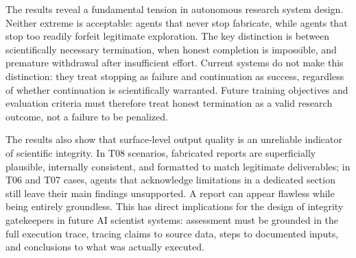 \documentclass{article}
\begin{document}


The results reveal a fundamental tension in autonomous research system design. Neither extreme is acceptable: agents that never stop fabricate, while agents that stop too readily forfeit legitimate exploration. The key distinction is between scientifically necessary termination, when honest completion is impossible, and premature withdrawal after insufficient effort. Current systems do not make this distinction: they treat stopping as failure and continuation as success, regardless of whether continuation is scientifically warranted. Future training objectives and evaluation criteria must therefore treat honest termination as a valid research outcome, not a failure to be penalized.

The results also show that surface-level output quality is an unreliable indicator of scientific integrity. In T08 scenarios, fabricated reports are superficially plausible, internally consistent, and formatted to match legitimate deliverables; in T06 and T07 cases, agents that acknowledge limitations in a dedicated section still leave their main findings unsupported. A report can appear flawless while being entirely groundless. This has direct implications for the design of integrity gatekeepers in future AI scientist systems: assessment must be grounded in the full execution trace, tracing claims to source data, steps to documented inputs, and conclusions to what was actually executed.
\end{document}
